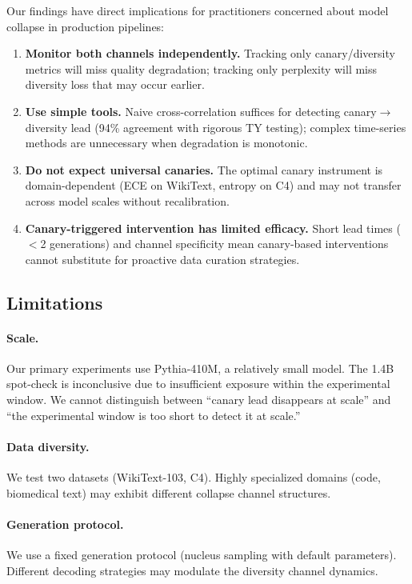 \documentclass[letterpaper,11pt]{article}
\begin{document}
Our findings have direct implications for practitioners concerned about model collapse in production pipelines:

\begin{enumerate}
    \item \textbf{Monitor both channels independently.} Tracking only canary/diversity metrics will miss quality degradation; tracking only perplexity will miss diversity loss that may occur earlier.

    \item \textbf{Use simple tools.} Naive cross-correlation suffices for detecting canary$\to$diversity lead (94\% agreement with rigorous TY testing); complex time-series methods are unnecessary when degradation is monotonic.

    \item \textbf{Do not expect universal canaries.} The optimal canary instrument is domain-dependent (ECE on WikiText, entropy on C4) and may not transfer across model scales without recalibration.

    \item \textbf{Canary-triggered intervention has limited efficacy.} Short lead times ($<$2 generations) and channel specificity mean canary-based interventions cannot substitute for proactive data curation strategies.
\end{enumerate}

\subsection{Limitations}

\paragraph{Scale.} Our primary experiments use Pythia-410M, a relatively small model.
The 1.4B spot-check is inconclusive due to insufficient exposure within the experimental window.
We cannot distinguish between ``canary lead disappears at scale'' and ``the experimental window is too short to detect it at scale.''

\paragraph{Data diversity.} We test two datasets (WikiText-103, C4).
Highly specialized domains (code, biomedical text) may exhibit different collapse channel structures.

\paragraph{Generation protocol.} We use a fixed generation protocol (nucleus sampling with default parameters).
Different decoding strategies may modulate the diversity channel dynamics.
\end{document}
